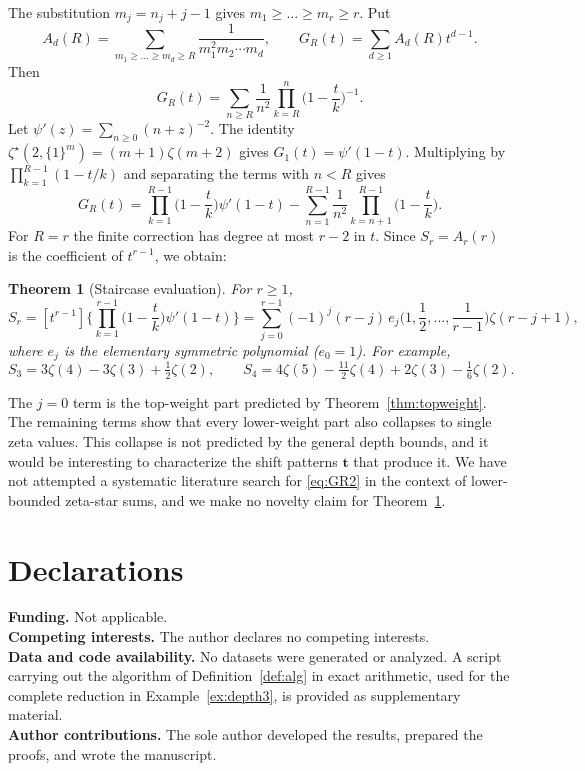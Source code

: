 \documentclass[11pt]{amsart}
\newtheorem{theorem}{Theorem}[section]
\theoremstyle{definition}
\theoremstyle{remark}
\numberwithin{equation}{section}
\newcommand{\tb}{\mathbf{t}}
\begin{document}
The substitution $m_j=n_j+j-1$ gives $m_1\ge\dots\ge m_r\ge r$. Put
\[
A_d(R)=\sum_{m_1\ge\dots\ge m_d\ge R}\frac{1}{m_1^2m_2\cdots m_d},\qquad G_R(t)=\sum_{d\ge1}A_d(R)t^{d-1}.
\]
Then
\begin{equation}\label{eq:GR}
G_R(t)=\sum_{n\ge R}\frac{1}{n^2}\prod_{k=R}^{n}\Big(1-\frac tk\Big)^{-1}.
\end{equation}
Let $\psi'(z)=\sum_{n\ge0}(n+z)^{-2}$. The identity $\zeta^\star(2,\{1\}^m)=(m+1)\zeta(m+2)$ \cite{OZ08} gives $G_1(t)=\psi'(1-t)$. Multiplying by $\prod_{k=1}^{R-1}(1-t/k)$ and separating the terms with $n<R$ gives
\begin{equation}\label{eq:GR2}
G_R(t)=\prod_{k=1}^{R-1}\Big(1-\frac tk\Big)\psi'(1-t)-\sum_{n=1}^{R-1}\frac1{n^2}\prod_{k=n+1}^{R-1}\Big(1-\frac tk\Big).
\end{equation}
For $R=r$ the finite correction has degree at most $r-2$ in $t$. Since $S_r=A_r(r)$ is the coefficient of $t^{r-1}$, we obtain:

\begin{theorem}[Staircase evaluation]\label{thm:staircase}
For $r\ge1$,
\[
S_r=[t^{r-1}]\Big\{\prod_{k=1}^{r-1}\Big(1-\frac tk\Big)\psi'(1-t)\Big\}=\sum_{j=0}^{r-1}(-1)^j(r-j)\,e_j\Big(1,\frac12,\dots,\frac1{r-1}\Big)\zeta(r-j+1),
\]
where $e_j$ is the elementary symmetric polynomial ($e_0=1$). For example,
\[
S_3=3\zeta(4)-3\zeta(3)+\tfrac12\zeta(2),\qquad S_4=4\zeta(5)-\tfrac{11}{2}\zeta(4)+2\zeta(3)-\tfrac16\zeta(2).
\]
\end{theorem}

The $j=0$ term is the top-weight part predicted by Theorem~\ref{thm:topweight}. The remaining terms show that every lower-weight part also collapses to single zeta values. This collapse is not predicted by the general depth bounds, and it would be interesting to characterize the shift patterns $\tb$ that produce it. We have not attempted a systematic literature search for \eqref{eq:GR2} in the context of lower-bounded zeta-star sums, and we make no novelty claim for Theorem~\ref{thm:staircase}.

\section*{Declarations}
\noindent\textbf{Funding.} Not applicable.\\
\textbf{Competing interests.} The author declares no competing interests.\\
\textbf{Data and code availability.} No datasets were generated or analyzed. A script carrying out the algorithm of Definition~\ref{def:alg} in exact arithmetic, used for the complete reduction in Example~\ref{ex:depth3}, is provided as supplementary material.\\
\textbf{Author contributions.} The sole author developed the results, prepared the proofs, and wrote the manuscript.
\end{document}
